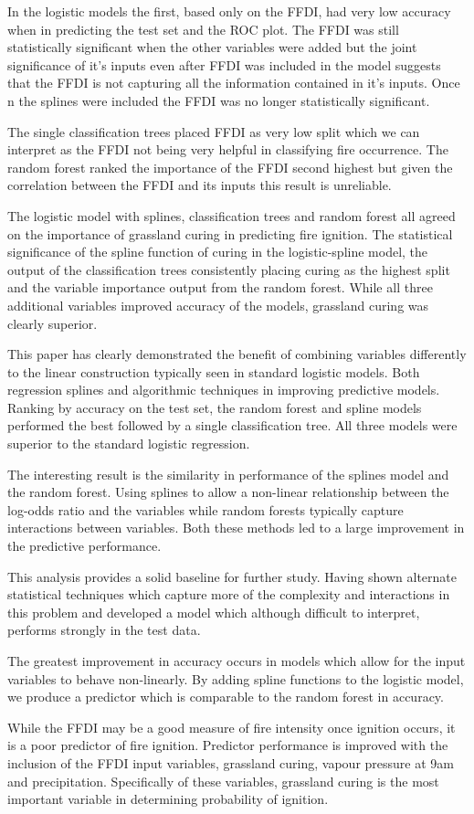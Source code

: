 \documentclass[11pt,a4paper]{article}
\begin{document}
In the logistic models the first, based only on the FFDI, had very low accuracy when  in predicting the test set and the ROC plot. The FFDI was still statistically significant when the other variables were added but the joint significance of it's inputs even after FFDI was included in the model suggests that the FFDI is not capturing all the information contained in it's inputs. Once n the splines were included the FFDI was no longer statistically significant.

The single classification trees placed FFDI as very low split which we can interpret as the FFDI not being very helpful in classifying fire occurrence. The random forest ranked the importance of the FFDI second highest but given the correlation between the FFDI and its inputs this result is unreliable.

The logistic model with splines, classification trees and random forest all agreed on the importance of grassland curing in predicting fire ignition. The statistical significance of the spline function of curing in the logistic-spline model, the output of the classification trees consistently placing curing as the highest split and the variable importance output from the random forest. While all three additional variables improved accuracy of the models, grassland curing was clearly superior.

This paper has clearly demonstrated the benefit of combining variables differently to the linear construction typically seen in standard logistic models. Both regression splines and algorithmic techniques in improving predictive models. Ranking by accuracy on the test set, the random forest and spline models performed the best followed by a single classification tree. All three models were superior to the standard logistic regression.

The interesting result is the similarity in performance of the splines model and the random forest. Using splines to allow a non-linear relationship between the log-odds ratio and the variables while random forests typically capture interactions between variables. Both these methods led to a large improvement in the predictive performance.

This analysis provides a solid baseline for further study. Having shown alternate statistical techniques which capture more of the complexity and interactions in this problem and developed a model which although difficult to interpret, performs strongly in the test data.


The greatest improvement in accuracy occurs in models which allow for the input variables to behave non-linearly. By adding spline functions to the logistic model, we produce a predictor which is comparable to the random forest in accuracy.

While the FFDI may be a good measure of fire intensity once ignition occurs, it is a poor predictor of fire ignition. Predictor performance is improved with the inclusion of the FFDI input variables, grassland curing, vapour pressure at 9am and precipitation. Specifically of these variables, grassland curing is the most important variable in determining probability of ignition.




\end{document}
